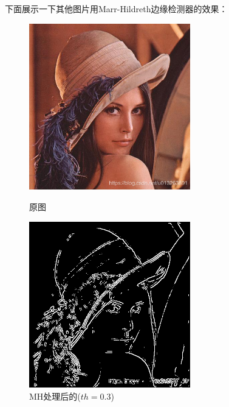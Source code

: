 \documentclass[11pt, a4paper, UTF8]{ctexart}
\begin{document}
下面展示一下其他图片用Marr-Hildreth边缘检测器的效果：
\begin{figure}[H]
  \centering
  \begin{minipage}[t]{0.48\textwidth}
  \centering
  \includegraphics[width=7cm]{lena.png}
  \caption{原图}
  \end{minipage}
  \begin{minipage}[t]{0.48\textwidth}
  \centering
  \includegraphics[width=7cm]{MH_alpha=0.3_lena.png}
  \caption{MH处理后的($th=0.3$)}
  \end{minipage}
\end{figure}
\end{document}
